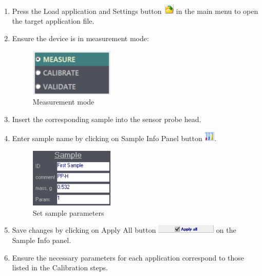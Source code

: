 \documentclass[a4paper,12pt]{article}
\begin{document}
\begin{enumerate}[ref={observation~\arabic*}]

\item Press the Load application and Settings button \includegraphics[height=0.5cm]{Btn_Open.png} in the main menu to open the target application file. 

\item Ensure the device is in measurement mode:

\begin{figure}[H]
\centering
\includegraphics[width=4cm]{ModeSwitcher.png}
\caption{Measurement mode}
\label{fig:Mode Switcher2}
\end{figure}


\item Insert the corresponding sample into the sensor probe head.

\item Enter sample name by clicking on Sample Info Panel button \includegraphics[height=0.5cm]{Btn_Sample.png}.

\begin{figure}[!ht]
\centering
\includegraphics[width=4cm]{Sample_parameters.PNG}
\caption{Set sample parameters}
\label{fig:Set sample parameters}
\end{figure}

\item Save changes by clicking on Apply All button \includegraphics[height=0.4cm]{Sample_Apply.png} on the Sample Info panel.

\item Ensure the necessary parameters for each application correspond to those listed in the Calibration steps.


\end{enumerate}
\end{document}
